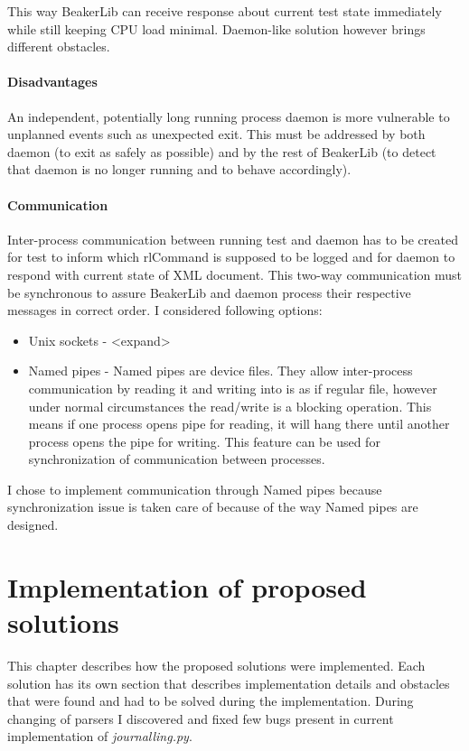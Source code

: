 This way BeakerLib can receive response about current test state immediately while still keeping CPU load minimal. Daemon-like solution however brings different obstacles.

\subsubsection{Disadvantages}
An independent, potentially long running process daemon is more vulnerable to unplanned events such as unexpected exit. This must be addressed by both daemon (to exit as safely as possible)  and by the rest of BeakerLib (to detect that daemon is no longer running and to behave accordingly). 

\subsubsection{Communication}
Inter-process communication between running test and daemon has to be created for test to inform which rlCommand is supposed to be logged and for daemon to respond with current state of XML document. This two-way communication must be synchronous to assure BeakerLib and daemon process their respective messages in correct order. I considered following options:

\begin{itemize}
\item Unix sockets  -  <expand>
\item Named pipes - Named pipes are device files. They allow inter-process communication by reading it and writing into is as if regular file, however under normal circumstances the read/write is a blocking operation\cite{pipes_blocking}. This means if one process opens pipe for reading, it will hang there until another process opens the pipe for writing. This feature can be used for synchronization of communication between processes. 
\end{itemize}


I chose to implement communication through Named pipes because synchronization issue is taken care of because of the way Named pipes are designed.


\chapter{Implementation of proposed solutions}
\label{implementations}
This chapter describes how the proposed solutions were implemented. Each solution has its own section that describes implementation details and obstacles that were found and had to be solved during the implementation.
During changing of parsers I discovered and fixed few bugs present in current implementation of \textit{journalling.py}.

